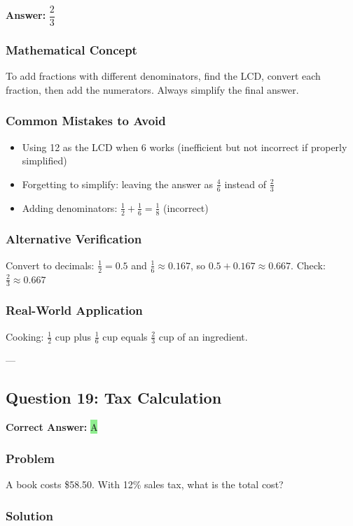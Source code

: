 \documentclass[12pt]{article}
\begin{document}
\textbf{Answer: } $\dfrac{2}{3}$

\subsubsection*{Mathematical Concept}
To add fractions with different denominators, find the LCD, convert each fraction, then add the numerators. Always simplify the final answer.

\subsubsection*{Common Mistakes to Avoid}
\begin{itemize}
\item Using 12 as the LCD when 6 works (inefficient but not incorrect if properly simplified)
\item Forgetting to simplify: leaving the answer as $\frac{4}{6}$ instead of $\frac{2}{3}$
\item Adding denominators: $\frac{1}{2} + \frac{1}{6} = \frac{1}{8}$ (incorrect)
\end{itemize}

\subsubsection*{Alternative Verification}
Convert to decimals: $\frac{1}{2} = 0.5$ and $\frac{1}{6} \approx 0.167$, so $0.5 + 0.167 \approx 0.667$. Check: $\frac{2}{3} \approx 0.667$ 

\subsubsection*{Real-World Application}
Cooking: $\frac{1}{2}$ cup plus $\frac{1}{6}$ cup equals $\frac{2}{3}$ cup of an ingredient.

---

\subsection{Question 19: Tax Calculation}

\textbf{Correct Answer: } \colorbox{lightgreen}{A}

\subsubsection*{Problem}
A book costs \$58.50. With 12\% sales tax, what is the total cost?

\subsubsection*{Solution}
\end{document}
